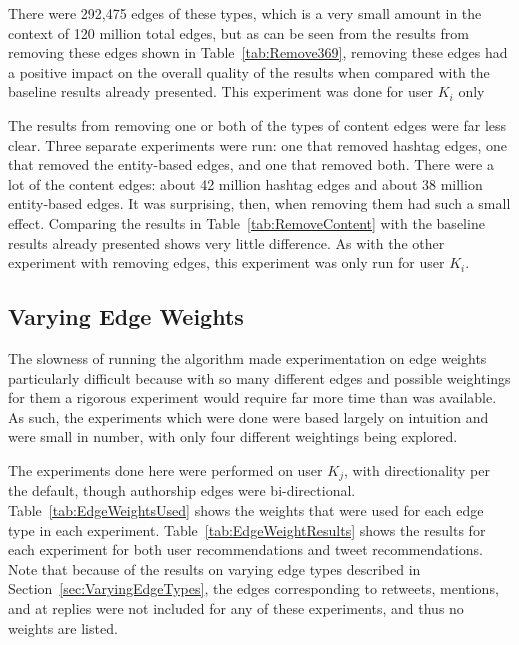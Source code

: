 There were 292,475 edges of these types, which is a very small amount in the context of 120 million total edges, but as can be seen from the results from removing these edges shown in Table~\ref{tab:Remove369}, removing these edges had a positive impact on the overall quality of the results when compared with the baseline results already presented. This experiment was done for user $K_{i}$ only %




The results from removing one or both of the types of content edges were far less clear. Three separate experiments were run: one that removed hashtag edges, one that removed the entity-based edges, and one that removed both. There were a lot of the content edges: about 42 million hashtag edges and about 38 million entity-based edges. It was surprising, then, when removing them had such a small effect. Comparing the results in Table~\ref{tab:RemoveContent} with the baseline results already presented shows very little difference. As with the other experiment with removing edges, this experiment was only run for user $K_{i}$.




\subsection{Varying Edge Weights}

The slowness of running the algorithm made experimentation on edge weights particularly difficult because with so many different edges and possible weightings for them a rigorous experiment would require far more time than was available. As such, the experiments which were done were based largely on intuition and were small in number, with only four different weightings being explored.

The experiments done here were performed on user $K_{j}$, with directionality per the default, though authorship edges were bi-directional. Table~\ref{tab:EdgeWeightsUsed} shows the weights that were used for each edge type in each experiment. Table~\ref{tab:EdgeWeightResults} shows the results for each experiment for both user recommendations and tweet recommendations. Note that because of the results on varying edge types described in Section~\ref{sec:VaryingEdgeTypes}, the edges corresponding to retweets, mentions, and at replies were not included for any of these experiments, and thus no weights are listed.

